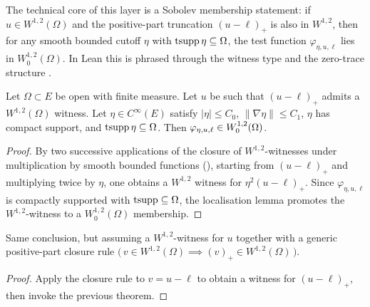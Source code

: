 The technical core of this layer is a Sobolev membership statement: if
$u \in W^{1,2}(\Omega)$ and the positive-part truncation
$(u - \ell)_+$ is also in $W^{1,2}$, then for any smooth bounded
cutoff $\eta$ with $\mathrm{tsupp}\,\eta \subseteq \Omega$, the test function
$\varphi_{\eta,u,\ell}$ lies in $W^{1,2}_0(\Omega)$.  In Lean this is
phrased through the witness type  and the
zero-trace structure .

\begin{theorem}
\label{thm:deGiorgiCutoffTest_memW01p_of_truncWitness}
\leanok
{}
Let $\Omega \subset E$ be open with finite measure.  Let $u$ be such
that $(u-\ell)_+$ admits a $W^{1,2}(\Omega)$ witness.  Let $\eta \in
C^\infty(E)$ satisfy $|\eta| \le C_0$, $\|\nabla \eta\| \le C_1$,
$\eta$ has compact support, and $\mathrm{tsupp}\,\eta \subseteq \Omega$.
Then $\varphi_{\eta,u,\ell} \in W_0^{1,2}(\Omega)$.
\end{theorem}

\begin{proof}
\leanok
{}

By two successive applications of the closure of $W^{1,2}$-witnesses
under multiplication by smooth bounded functions
(), starting from $(u-\ell)_+$
and multiplying twice by $\eta$, one obtains a $W^{1,2}$ witness for
$\eta^2 (u-\ell)_+$.  Since $\varphi_{\eta,u,\ell}$ is compactly
supported with $\mathrm{tsupp} \subseteq \Omega$, the localisation lemma
 promotes the
$W^{1,2}$-witness to a $W^{1,2}_0(\Omega)$ membership.
\end{proof}

\begin{theorem}
\label{thm:deGiorgiCutoffTest_memW01p_of_posPart}
\leanok
{}
Same conclusion, but assuming a $W^{1,2}$-witness for $u$ together
with a generic positive-part closure rule
$\bigl(\, v \in W^{1,2}(\Omega) \implies (v)_+ \in W^{1,2}(\Omega)\,\bigr)$.
\end{theorem}

\begin{proof}
\leanok
{}

Apply the closure rule to $v = u-\ell$ to obtain a witness for
$(u-\ell)_+$, then invoke the previous theorem.
\end{proof}


